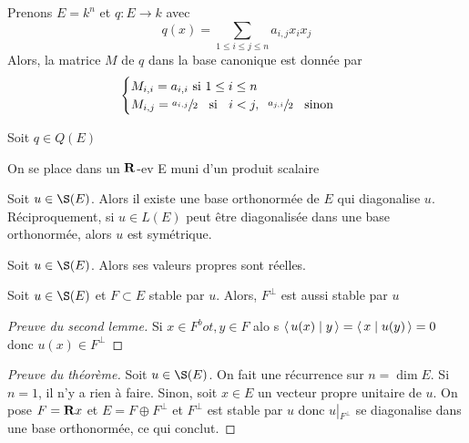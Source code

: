 \begin{ex}
    Prenons $E=k^n$ et  $q:E \longrightarrow k$ avec \[q(x)=\sum_{1\leq i\leq j\leq n}a_{i,j}x_ix_j\]
    Alors, la matrice $M$ de $q$ dans la base canonique est donnée par \[
    \begin{cases}
        M_{i,i}=a_{i,i}\text{ si }1\leq i\leq n\\
        M_{i,j}= \sfrac{a_{i,j}}2 \;\;\text{ si }\;\;i<j, \;\;\sfrac{a_{j,i}}2\;\;\text{ sinon }
    \end{cases}
    \] 
\end{ex}

\begin{prop}
    Soit $q \in  Q(E)$
\end{prop}



On se place dans un $ \mathbf R$-ev E muni d'un produit scalaire

\begin{thm}
    Soit $u \in  \S(E)$. Alors il existe une base orthonormée de $E$ qui diagonalise  $u$. Réciproquement, si  $u \in  L(E)$ peut être diagonalisée dans une base orthonormée, alors  $u$ est symétrique.
\end{thm}

\begin{lmm}
    Soit $u \in  \S(E)$. Alors ses valeurs propres sont réelles.
\end{lmm}

\begin{lmm}
    Soit $u \in  \S(E)$ et $F\subset E$ stable par  $u$. Alors,  $F^\bot$ est aussi stable par  $u$
\end{lmm}

\begin{proof}[Preuve du second lemme]
    Si $x \in  F^bot, y \in  F$ alo s $ \scalar{u(x)}{y}= \scalar{x}{u(y)}=0  $ donc $u(x)\in F^\bot$
\end{proof}

\begin{proof}[Preuve du théorème]
    Soit $u \in  \S(E)$. On fait une récurrence sur $n=\dim E$. Si  $n=1$, il n'y a rien à faire. Sinon, soit  $x\in  E$ un vecteur propre unitaire de $u$. On pose $F=\mathbf R x$ et $E=F\oplus F^\bot$ et  $F^\bot$ est stable par  $u$ donc  $u\left|_{F^\bot}\right.$ se diagonalise dans une base orthonormée, ce qui conclut.
\end{proof}


